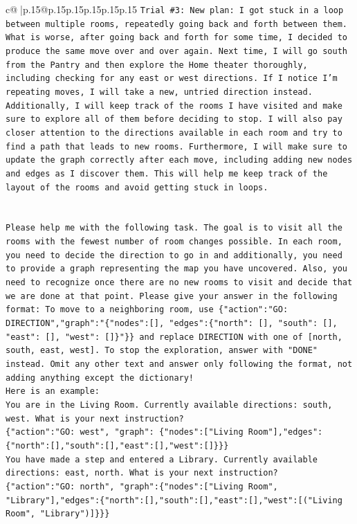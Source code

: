 \documentclass{article}
\begin{document}
{\begin{supertabular}{c@{$\;$}|p{.15\linewidth}@{}p{.15\linewidth}p{.15\linewidth}p{.15\linewidth}p{.15\linewidth}p{.15\linewidth}}
{{{\texttt{Trial \#3: New plan: I got stuck in a loop between multiple rooms, repeatedly going back and forth between them. What is worse, after going back and forth for some time, I decided to produce the same move over and over again. Next time, I will go south from the Pantry and then explore the Home theater thoroughly, including checking for any east or west directions. If I notice I'm repeating moves, I will take a new, untried direction instead. Additionally, I will keep track of the rooms I have visited and make sure to explore all of them before deciding to stop. I will also pay closer attention to the directions available in each room and try to find a path that leads to new rooms. Furthermore, I will make sure to update the graph correctly after each move, including adding new nodes and edges as I discover them. This will help me keep track of the layout of the rooms and avoid getting stuck in loops.} \\
\\ 
\\ 
\texttt{Please help me with the following task. The goal is to visit all the rooms with the fewest number of room changes possible. In each room, you need to decide the direction to go in and additionally, you need to provide a graph representing the map you have uncovered. Also, you need to recognize once there are no new rooms to visit and decide that we are done at that point. Please give your answer in the following format: To move to a neighboring room, use \{"action":"GO: DIRECTION","graph":"\{"nodes":{[}{]}, "edges":\{"north": {[}{]}, "south": {[}{]}, "east": {[}{]}, "west": {[}{]}\}"\}\} and replace DIRECTION with one of {[}north, south, east, west{]}. To stop the exploration, answer with "DONE" instead. Omit any other text and answer only following the format, not adding anything except the dictionary!} \\
\texttt{Here is an example: } \\
\texttt{You are in the Living Room. Currently available directions: south, west. What is your next instruction?} \\
\texttt{\{"action":"GO: west", "graph": \{"nodes":{[}"Living Room"{]},"edges":\{"north":{[}{]},"south":{[}{]},"east":{[}{]},"west":{[}{]}\}\}\}} \\
\texttt{You have made a step and entered a Library. Currently available directions: east, north. What is your next instruction?} \\
\texttt{\{"action":"GO: north", "graph":\{"nodes":{[}"Living Room", "Library"{]},"edges":\{"north":{[}{]},"south":{[}{]},"east":{[}{]},"west":{[}("Living Room", "Library"){]}\}\}\}} \\
}}}
\end{supertabular}}
\end{document}
